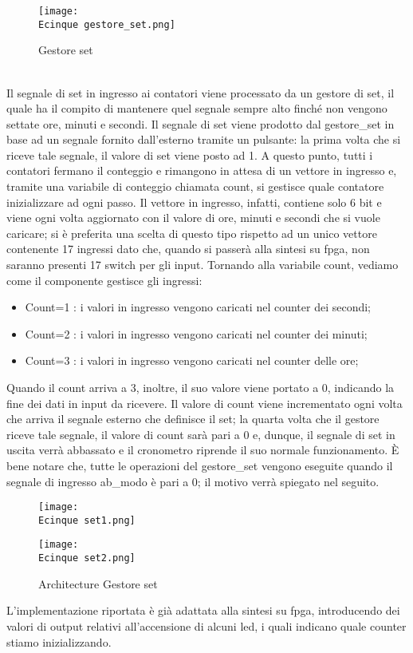 \documentclass[12pt]{article}
\def \Ecinque {Allegati/Esercizio5/}
\begin{document}
\begin{figure}[ht!]
    \centering
    \texttt{[image: \\Ecinque gestore\_set.png]}
    \caption{Gestore set}
\end{figure}
\\Il segnale di set in ingresso ai contatori viene processato da un gestore di set, il quale ha il compito di mantenere quel segnale sempre alto finché non vengono settate ore, minuti e secondi.
Il segnale di set viene prodotto dal gestore\_set in base ad un segnale fornito dall’esterno tramite un pulsante: la prima volta che si riceve tale segnale, il valore di set viene posto ad 1.
A questo punto, tutti i contatori fermano il conteggio e rimangono in attesa di un vettore in ingresso e, tramite una variabile di conteggio chiamata count, si gestisce quale contatore inizializzare ad ogni passo.
Il vettore in ingresso, infatti, contiene solo 6 bit e viene ogni volta aggiornato con il valore di ore, minuti e secondi che si vuole caricare; si è preferita una scelta di questo tipo rispetto ad un unico vettore contenente 17 ingressi dato che, quando si passerà alla sintesi su fpga, non saranno presenti 17 switch per gli input.
Tornando alla variabile count, vediamo come il componente gestisce gli ingressi:
\begin{itemize}
    \item Count=1 : i valori in ingresso vengono caricati nel counter dei secondi;
    \item Count=2 : i valori in ingresso vengono caricati nel counter dei minuti;
    \item Count=3 : i valori in ingresso vengono caricati nel counter delle ore;
\end{itemize}
Quando il count arriva a 3, inoltre, il suo valore viene portato a 0, indicando la fine dei dati in input da ricevere.
Il valore di count viene incrementato ogni volta che arriva il segnale esterno che definisce il set; la quarta volta che il gestore riceve tale segnale, il valore di count sarà pari a 0 e, dunque, il segnale di set in uscita verrà abbassato e il cronometro riprende il suo normale funzionamento.
È bene notare che, tutte le operazioni del gestore\_set vengono eseguite quando il segnale di ingresso ab\_modo è pari a 0; il motivo verrà spiegato nel seguito.
\begin{figure}[ht!]
    \centering
    \texttt{[image: \\Ecinque set1.png]}
\end{figure}
\begin{figure}[ht!]
    \centering
    \texttt{[image: \\Ecinque set2.png]}
    \caption{Architecture Gestore set}
\end{figure}
\clearpage
L’implementazione riportata è già adattata alla sintesi su fpga, introducendo dei valori di output relativi all’accensione di alcuni led, i quali indicano quale counter stiamo inizializzando.
\end{document}
